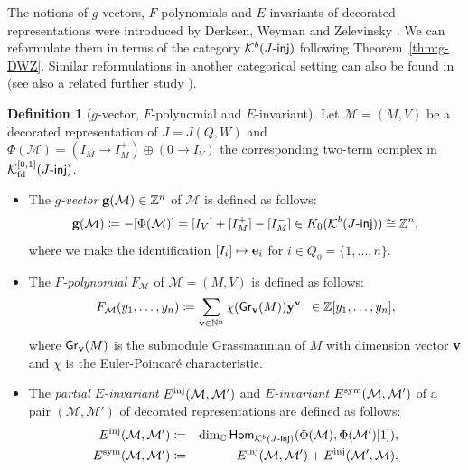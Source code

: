 \documentclass[12pt]{amsart}
\theoremstyle{definition}
\newtheorem{definition}[theorem]{Definition}
\theoremstyle{remark}
\numberwithin{equation}{section}
\newcommand{\opname}[1]{\operatorname{\mathsf{#1}}}
\newcommand{\Gr}{\opname{Gr}\nolimits}
\newcommand{\Hom}{\opname{Hom}}
\begin{document}
    The notions of $g$-vectors, $F$-polynomials and $E$-invariants of decorated representations were introduced by Derksen, Weyman and Zelevinsky \cite{DWZ10}. We can reformulate them  in terms of the category $\mathcal{K}^b(J\mathchar`-\mathsf{inj})$ following Theorem~\ref{thm:g-DWZ}.
    Similar reformulations in another categorical setting can also be found in \cite{Plamondon-2011} (see also a related further study \cite{CLS-2015}). 
    \begin{definition}[{$g$-vector, $F$-polynomial and $E$-invariant}] \label{def:g-F-E}
    Let $\mathcal M=(M,V)$ be a decorated representation of $J=J(Q,W)$ and $\Phi(\mathcal M)=(I_M^{-}{\to}I_M^+)\oplus (0\to I_V)$ the corresponding two-term complex in $\mathcal{K}_{\rm fd}^{[0,1]}(J\mathchar`-\mathsf{inj})$. 
    \begin{itemize}
        \item [(i)] The  {\em $g$-vector} ${\bf g}({\mathcal M})\in\mathbb Z^n$ of $\mathcal M$ is defined as follows:
       \[{\bf g}(\mathcal{M}) \coloneqq -[\Phi(\mathcal M)]=[I_V]+[I_M^+] -[I_M^-]\in K_0(\mathcal{K}^b(J\mathchar`-\mathsf{inj}))\cong \mathbb{Z}^n,\]
        where we make the identification  $[I_i] \mapsto {\bf e}_i$ for $i\in Q_0=\{1,\ldots,n\}$.


\item [(ii)] The {\em $F$-polynomial} $F_{\mathcal M}$ of $\mathcal M=(M,V)$ is defined as follows:
\[ F_{\mathcal M}(y_1,\ldots,y_n) \coloneqq   \sum_{{\bf v}\in\mathbb N^n}\chi(\Gr_{\bf v}(M)){\bf y}^{\bf v}\;\;\in\mathbb Z[y_1,\ldots,y_n],
\]
where $\Gr_{\bf v}(M)$ is the submodule Grassmannian of $M$ with dimension vector ${\bf v}$ and $\chi$ is the Euler-Poincar\'{e} characteristic.

\item[(iii)]  The {\em partial $E$-invariant} $ E^{\rm inj}(\mathcal M,\mathcal M')$ and {\em $E$-invariant} $E^{\rm sym}(\mathcal M,\mathcal M')$ of a pair $(\mathcal M,\mathcal M')$ of decorated representations are defined as follows:
\begin{eqnarray}\label{eqn:E-inj}
    E^{\rm inj}(\mathcal M,\mathcal M') &\coloneqq&   \dim_{\mathbb C} \Hom_{\mathcal{K}^{b}(J\mathchar`-\mathsf{inj})}(\Phi(\mathcal M),\Phi(\mathcal M')[1]),\\
    E^{\rm sym}(\mathcal M,\mathcal M') &\coloneqq&    E^{\rm inj}(\mathcal M,\mathcal M')+E^{\rm inj}(\mathcal M',\mathcal M).\label{eqn:E-sym}
\end{eqnarray}
    \end{itemize}
\end{definition}
\end{document}
